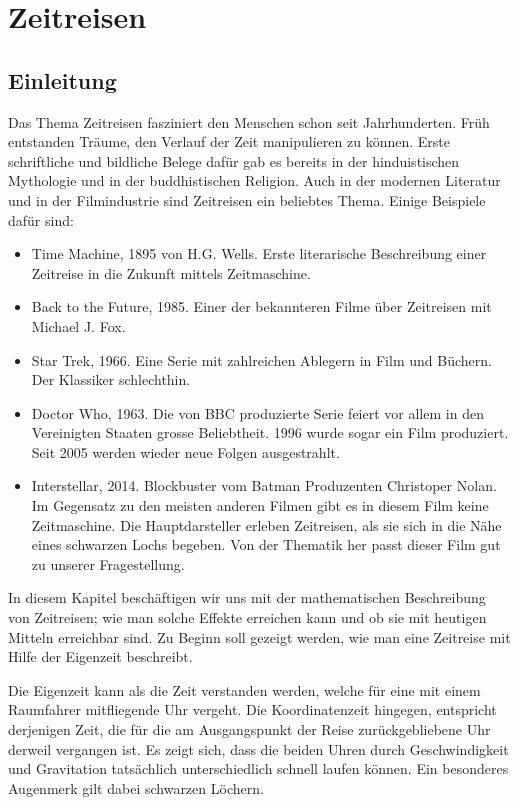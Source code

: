 \chapter{Zeitreisen\label{chapter:zeitreisen}}
\begin{refsection}
\section{Einleitung}
	Das Thema Zeitreisen fasziniert den Menschen schon seit Jahrhunderten. Früh entstanden Träume, den Verlauf der Zeit manipulieren zu können. Erste schriftliche und bildliche Belege dafür gab es bereits in der hinduistischen Mythologie und in der buddhistischen Religion. Auch in der modernen Literatur und in der Filmindustrie sind Zeitreisen ein beliebtes Thema. Einige Beispiele dafür sind: 
\begin{itemize}
    \item Time Machine, 1895 von H.G. Wells. Erste literarische Beschreibung einer Zeitreise in die Zukunft mittels Zeitmaschine.
    \item Back to the Future, 1985. Einer der bekannteren Filme über Zeitreisen mit Michael J. Fox.
    \item Star Trek, 1966. Eine Serie mit zahlreichen Ablegern in Film und Büchern. Der Klassiker schlechthin. 
    \item Doctor Who, 1963. Die von BBC produzierte Serie feiert vor allem in den Vereinigten Staaten grosse Beliebtheit. 1996 wurde sogar ein Film produziert. Seit 2005 werden wieder neue Folgen ausgestrahlt.
    \item Interstellar, 2014. Blockbuster vom Batman Produzenten Christoper Nolan. Im Gegensatz zu den meisten anderen Filmen gibt es in diesem Film keine Zeitmaschine. Die Hauptdarsteller erleben Zeitreisen, als sie sich in die Nähe eines schwarzen Lochs begeben. Von der Thematik her passt dieser Film gut zu unserer Fragestellung.
\end{itemize}

In diesem Kapitel beschäftigen wir uns mit der mathematischen Beschreibung von Zeitreisen; wie man solche Effekte erreichen kann und ob sie mit heutigen Mitteln erreichbar sind. Zu Beginn soll gezeigt werden, wie man eine Zeitreise mit Hilfe der Eigenzeit beschreibt.

Die Eigenzeit kann als die Zeit verstanden werden, welche für eine mit einem Raumfahrer mitfliegende Uhr vergeht. Die Koordinatenzeit hingegen, entspricht derjenigen Zeit, die für die am Ausgangspunkt der Reise zurückgebliebene Uhr derweil vergangen ist.
Es zeigt sich, dass die beiden Uhren durch Geschwindigkeit und Gravitation tatsächlich unterschiedlich schnell laufen können. Ein besonderes Augenmerk gilt dabei schwarzen Löchern. 


\end{refsection}
